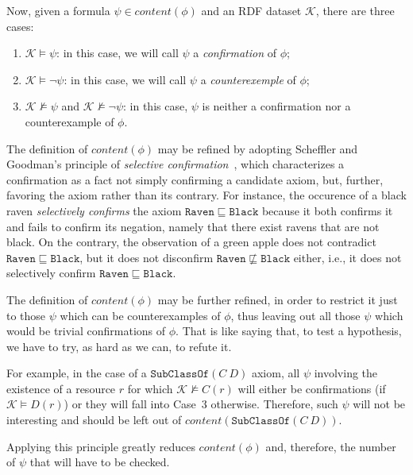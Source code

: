 \documentclass{llncs}
\begin{document}
Now, given a formula $\psi \in content(\phi)$ and an RDF dataset $\mathcal{K}$,
there are three cases:
\begin{enumerate}
\item $\mathcal{K} \models \psi$:
  in this case, we will call $\psi$ a \emph{confirmation} of $\phi$;
\item $\mathcal{K} \models \neg\psi$:
  in this case, we will call $\psi$ a \emph{counterexemple} of $\phi$;
\item $\mathcal{K} \not\models \psi$ and $\mathcal{K} \not\models \neg\psi$:
  in this case, $\psi$ is neither a confirmation nor a counterexample of $\phi$.
\end{enumerate}

The definition of $content(\phi)$ may be refined by adopting Scheffler and Goodman's principle of
\emph{selective confirmation}~\cite{SchefflerGoodman1972},
which characterizes a confirmation as a fact not simply confirming a candidate axiom, but, further,
favoring the axiom rather than its contrary.
For instance, the occurence of a black raven \emph{selectively confirms} the axiom
$\mathtt{Raven} \sqsubseteq \mathtt{Black}$ because it both confirms it and fails to confirm its
negation, namely that there exist ravens that are not black. On the contrary, the observation of
a green apple does not contradict $\mathtt{Raven} \sqsubseteq \mathtt{Black}$,
but it does not disconfirm $\mathtt{Raven} \not\sqsubseteq \mathtt{Black}$
either, i.e., it does not selectively confirm $\mathtt{Raven} \sqsubseteq \mathtt{Black}$.


The definition of $content(\phi)$ may be further refined, in order to restrict it
just to those $\psi$ which can be counterexamples of $\phi$,
thus leaving out all those $\psi$ which would be trivial confirmations of $\phi$.
That is like saying that, to test a hypothesis, we have to try, as hard as we can,
to refute it.

For example, in the case of a $\mathtt{SubClassOf}(C\ D)$ axiom,
all $\psi$ involving the existence of a resource $r$ for which $\mathcal{K} \not\models C(r)$
will either be confirmations (if $\mathcal{K} \models D(r)$) or they
will fall into Case~3 otherwise. Therefore, such $\psi$ will not be interesting
and should be left out of $content(\mathtt{SubClassOf}(C\ D))$.



Applying this principle greatly reduces $content(\phi)$ and, therefore,
the number of $\psi$ that will have to be checked.
\end{document}
